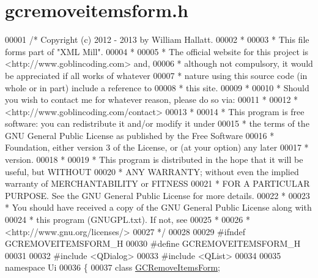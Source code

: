 \hypertarget{gcremoveitemsform_8h_source}{\section{gcremoveitemsform.\-h}
}

\begin{DoxyCode}
00001 \textcolor{comment}{/* Copyright (c) 2012 - 2013 by William Hallatt.}
00002 \textcolor{comment}{ *}
00003 \textcolor{comment}{ * This file forms part of "XML Mill".}
00004 \textcolor{comment}{ *}
00005 \textcolor{comment}{ * The official website for this project is <http://www.goblincoding.com> and,}
00006 \textcolor{comment}{ * although not compulsory, it would be appreciated if all works of whatever}
00007 \textcolor{comment}{ * nature using this source code (in whole or in part) include a reference to}
00008 \textcolor{comment}{ * this site.}
00009 \textcolor{comment}{ *}
00010 \textcolor{comment}{ * Should you wish to contact me for whatever reason, please do so via:}
00011 \textcolor{comment}{ *}
00012 \textcolor{comment}{ *                 <http://www.goblincoding.com/contact>}
00013 \textcolor{comment}{ *}
00014 \textcolor{comment}{ * This program is free software: you can redistribute it and/or modify it
       under}
00015 \textcolor{comment}{ * the terms of the GNU General Public License as published by the Free
       Software}
00016 \textcolor{comment}{ * Foundation, either version 3 of the License, or (at your option) any later}
00017 \textcolor{comment}{ * version.}
00018 \textcolor{comment}{ *}
00019 \textcolor{comment}{ * This program is distributed in the hope that it will be useful, but WITHOUT}
00020 \textcolor{comment}{ * ANY WARRANTY; without even the implied warranty of MERCHANTABILITY or
       FITNESS}
00021 \textcolor{comment}{ * FOR A PARTICULAR PURPOSE.  See the GNU General Public License for more
       details.}
00022 \textcolor{comment}{ *}
00023 \textcolor{comment}{ * You should have received a copy of the GNU General Public License along with}
00024 \textcolor{comment}{ * this program (GNUGPL.txt).  If not, see}
00025 \textcolor{comment}{ *}
00026 \textcolor{comment}{ *                    <http://www.gnu.org/licenses/>}
00027 \textcolor{comment}{ */}
00028 
00029 \textcolor{preprocessor}{#ifndef GCREMOVEITEMSFORM\_H}
00030 \textcolor{preprocessor}{}\textcolor{preprocessor}{#define GCREMOVEITEMSFORM\_H}
00031 \textcolor{preprocessor}{}
00032 \textcolor{preprocessor}{#include <QDialog>}
00033 \textcolor{preprocessor}{#include <QList>}
00034 
00035 \textcolor{keyword}{namespace }Ui
00036 \{
00037   \textcolor{keyword}{class }\hyperlink{class_g_c_remove_items_form}{GCRemoveItemsForm};

\end{DoxyCode}
